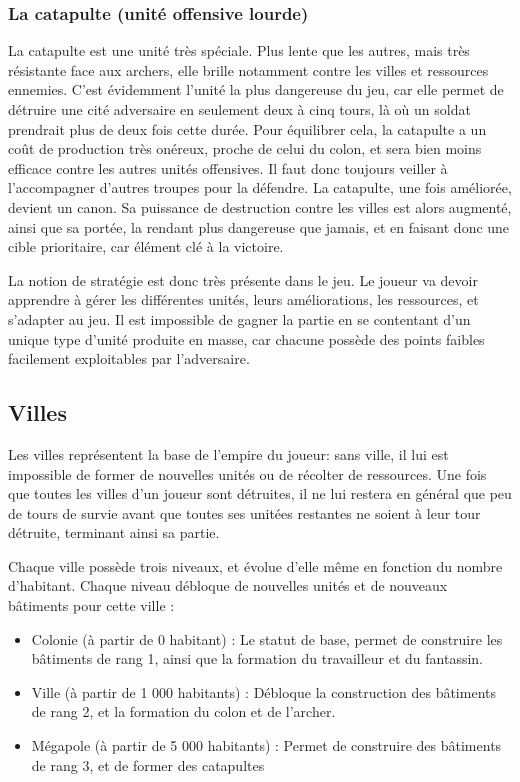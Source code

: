 \documentclass[12pt]{report}
\begin{document}
\subsubsection{La catapulte (unité offensive lourde)}

La catapulte est une unité très spéciale. Plus lente que les autres, mais très
résistante face aux archers, elle brille notamment contre les villes et
ressources ennemies. C’est évidemment l’unité la plus dangereuse du jeu, car
elle permet de détruire une cité adversaire en seulement deux à cinq tours, là
où un soldat prendrait plus de deux fois cette durée. Pour équilibrer cela, la
catapulte a un coût de production très onéreux, proche de celui du colon, et
sera bien moins efficace contre les autres unités offensives. Il faut donc
toujours veiller à l’accompagner d’autres troupes pour la défendre. La
catapulte, une fois améliorée, devient un canon. Sa puissance de destruction
contre les villes est alors augmenté, ainsi que sa portée, la rendant plus
dangereuse que jamais, et en faisant donc une cible prioritaire, car élément clé
à la victoire.

La notion de stratégie est donc très présente dans le jeu. Le joueur va devoir
apprendre à gérer les différentes unités, leurs améliorations, les ressources,
et s’adapter au jeu. Il est impossible de gagner la partie en se contentant d’un
unique type d’unité produite en masse, car chacune possède des points faibles
facilement exploitables par l’adversaire.

\subsection{Villes}

Les villes représentent la base de l’empire du joueur: sans ville, il lui est
impossible de former de nouvelles unités ou de récolter de ressources. Une fois
que toutes les villes d’un joueur sont détruites, il ne lui restera en général
que peu de tours de survie avant que toutes ses unitées restantes ne soient à
leur tour détruite, terminant ainsi sa partie.

Chaque ville possède trois niveaux, et évolue d’elle même en fonction du nombre
d’habitant. Chaque niveau débloque de nouvelles unités et de nouveaux bâtiments
pour cette ville :

\begin{itemize}
    \item Colonie (à partir de 0 habitant) : Le statut de base, permet de
        construire les bâtiments de rang 1, ainsi que la formation du
        travailleur et du fantassin.
    \item Ville (à partir de 1 000 habitants) : Débloque la construction des
        bâtiments de rang 2, et la formation du colon et de l’archer.
    \item Mégapole (à partir de 5 000 habitants) : Permet de construire des
        bâtiments de rang 3, et de former des catapultes
\end{itemize}
\end{document}
